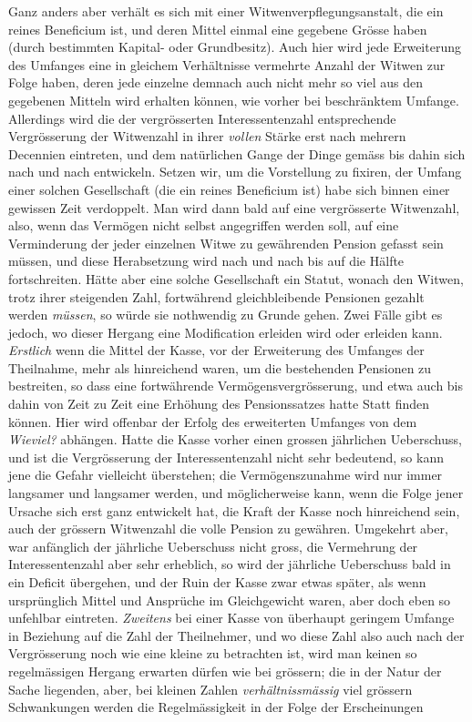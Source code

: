 Ganz anders aber verhält es sich mit einer Witwenverpflegungsanstalt, die ein reines Beneficium ist, und deren Mittel einmal eine gegebene Grösse haben (durch bestimmten Kapital- oder Grundbesitz). Auch hier wird jede Erweiterung des Umfanges eine in gleichem Verhältnisse vermehrte Anzahl der Witwen zur Folge haben, deren jede einzelne demnach auch nicht mehr so viel aus den gegebenen Mitteln wird erhalten können, wie vorher bei beschränktem Umfange. Allerdings wird die der vergrösserten Interessentenzahl entsprechende Vergrösserung der Witwenzahl in ihrer \textit{vollen} Stärke erst nach mehrern Decennien eintreten, und dem natürlichen Gange der Dinge gemäss bis dahin sich nach und nach entwickeln. Setzen wir, um die Vorstellung zu fixiren, der Umfang einer solchen Gesellschaft (die ein reines Beneficium ist) habe sich binnen einer gewissen Zeit verdoppelt. Man wird dann bald auf eine vergrösserte Witwenzahl, also, wenn das Vermögen nicht selbst angegriffen werden soll, auf eine Verminderung der jeder einzelnen Witwe zu gewährenden Pension gefasst sein müssen, und diese Herabsetzung wird nach und nach bis auf die Hälfte fortschreiten. Hätte aber eine solche Gesellschaft ein Statut, wonach den Witwen, trotz ihrer steigenden Zahl, fortwährend gleichbleibende Pensionen gezahlt werden \textit{müssen}, so würde sie nothwendig zu Grunde gehen. Zwei Fälle gibt es jedoch, wo dieser Hergang eine Modification erleiden wird oder erleiden kann. \textit{Erstlich} wenn die Mittel der Kasse, vor der Erweiterung des Umfanges der Theilnahme, mehr als hinreichend waren, um die bestehenden Pensionen zu bestreiten, so dass eine fortwährende Vermögensvergrösserung, und etwa auch bis dahin von Zeit zu Zeit eine Erhöhung des Pensionssatzes hatte Statt finden können. Hier wird offenbar der Erfolg des erweiterten Umfanges von dem \textit{Wieviel?} abhängen. Hatte die Kasse vorher einen grossen jährlichen Ueberschuss, und ist die Vergrösserung der Interessentenzahl nicht sehr bedeutend, so kann jene die Gefahr vielleicht überstehen; die Vermögenszunahme wird nur immer langsamer und langsamer werden, und möglicherweise kann, wenn die Folge jener Ursache sich erst ganz entwickelt hat, die Kraft der Kasse noch hinreichend sein, auch der grössern Witwenzahl die volle Pension zu gewähren. Umgekehrt aber, war anfänglich der jährliche Ueberschuss nicht gross, die Vermehrung der Interessentenzahl aber sehr erheblich, so wird der jährliche Ueberschuss bald in ein Deficit übergehen, und der Ruin der Kasse zwar etwas später, als wenn ursprünglich Mittel und Ansprüche im Gleichgewicht waren, aber doch eben so unfehlbar eintreten. \textit{Zweitens} bei einer Kasse von überhaupt geringem Umfange in Beziehung auf die Zahl der Theilnehmer, und wo diese Zahl also auch nach der Vergrösserung noch wie eine kleine zu betrachten ist, wird man keinen so regelmässigen Hergang erwarten dürfen wie bei grössern; die in der Natur der Sache liegenden, aber, bei kleinen Zahlen \textit{verhältnissmässig} viel grössern Schwankungen werden die Regelmässigkeit in der Folge der Erscheinungen
